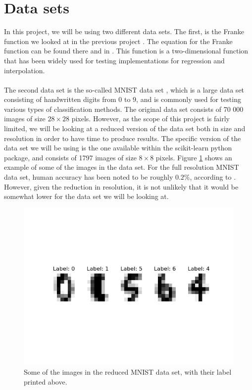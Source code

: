 \documentclass[a4paper]{article}
\begin{document}
\section{Data sets} \label{chap:data_sets}
In this project, we will be using two different data sets. The first, is the Franke function we looked at in the previous project \cite{Github1}. The equation for the Franke function can be found there and in \cite{Franke}. This function is a two-dimensional function that has been widely used for testing implementations for regression and interpolation.
\\\\
%
The second data set is the so-called MNIST data set \cite{MNIST}, which is a large data set consisting of handwritten digits from 0 to 9, and is commonly used for testing various types of classification methods. The original data set consists of 70 000 images of size $28\times28$ pixels. However, as the scope of this project is fairly limited, we will be looking at a reduced version of the data set both in size and resolution in order to have time to produce results. The specific version of the data set we will be using is the one available within the scikit-learn python package, and consists of 1797 images of size $8\times8$ pixels. Figure \ref{fig:digits} shows an example of some of the images in the data set. For the full resolution MNIST data set, human accuracy has been noted to be roughly $0.2$\%, according to \cite{c2012}. However, given the reduction in resolution, it is not unlikely that it would be somewhat lower for the data set we will be looking at.
\begin{figure}[H]
	\centering
	\includegraphics[scale=0.6]{../figures/digits.png}
	\caption{Some of the images in the reduced MNIST data set, with their label printed above.}
	\label{fig:digits}
\end{figure}
\end{document}
